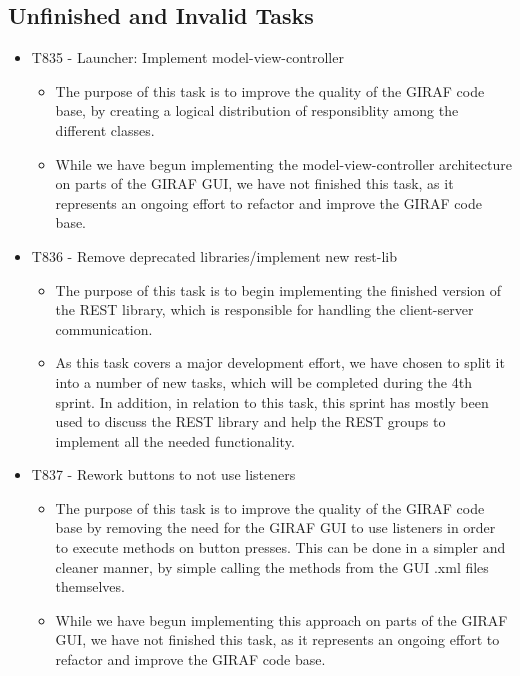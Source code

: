 \subsection{Unfinished and Invalid Tasks}\label{S2Invalid}
\begin{itemize}
  \item T835 - Launcher: Implement model-view-controller
  \begin{itemize}
  	\item The purpose of this task is to improve the quality of the GIRAF code
  	base, by creating a logical distribution of responsiblity among the different
  	classes.
  	\item While we have begun implementing the model-view-controller architecture
  	on parts of the GIRAF GUI, we have not finished this task, as it represents
  	an ongoing effort to refactor and improve the GIRAF code base.
  \end{itemize}
  \item T836 - Remove deprecated libraries/implement new rest-lib
  \begin{itemize}
  	\item The purpose of this task is to begin implementing the finished version
  	of the REST library, which is responsible for handling the client-server
  	communication.
  	\item As this task covers a major development effort, we have chosen to split
  	it into a number of new tasks, which will be completed during the 4th sprint.
  	In addition, in relation to this task, this sprint has mostly been used to
  	discuss the REST library and help the REST groups to implement all the needed
  	functionality.  
  	\end{itemize}
  \item T837 - Rework buttons to not use listeners
  \begin{itemize}
    \item The purpose of this task is to improve the quality of the GIRAF code
    base by removing the need for the GIRAF GUI to use listeners in order to
    execute methods on button presses. This can be done in a simpler and cleaner
    manner, by simple calling the methods from the GUI .xml files themselves.
    \item While we have begun implementing this approach on parts of the GIRAF
    GUI, we have not finished this task, as it represents an ongoing effort to
    refactor and improve the GIRAF code base.
  \end{itemize}
\end{itemize}

